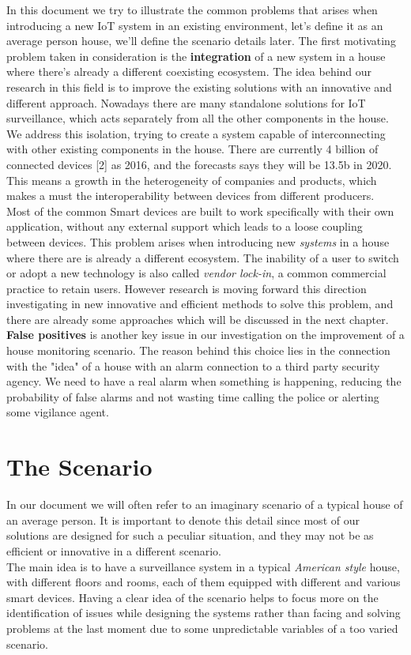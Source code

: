 In this document we try to illustrate the common problems that arises
when introducing a new IoT system in an existing environment, let's define it as
an average person house, we'll define the scenario details later.
The first motivating problem taken in consideration is the \textbf{integration} of a new
system in a house where there's already a different coexisting ecosystem.
The idea behind our research in this field is to improve the existing solutions
with an innovative and different approach. Nowadays there are many standalone
solutions for IoT surveillance, which acts separately from all the other
components in the house. We address this isolation, trying to create
a system capable of interconnecting with other existing components in the house.
There are currently 4 billion of connected devices [2] as 2016, and the forecasts
says they will be 13.5b in 2020. This means a growth in the heterogeneity of companies
and products, which makes a must the interoperability between devices from different
producers.\\
Most of the common Smart devices are built to work specifically with their own application,
without any external support which leads to a loose coupling between devices. This problem
arises when introducing new \textit{systems} in a house where there are is already a different
ecosystem. The inability of a user to switch or adopt a new technology is also called \textit{vendor lock-in},
a common commercial practice to retain users. However research is moving forward
this direction investigating in new innovative and efficient methods to solve this
problem, and there are already some approaches which will be discussed in the next chapter.
\textbf{False positives} is another key issue in our investigation on the improvement of a
house monitoring scenario. The reason behind this choice lies in the connection with the "idea"
of a house with an alarm connection to a third party security agency. We need to have a real
alarm when something is happening, reducing the probability of false alarms and not wasting time
calling the police or alerting some vigilance agent.


\section{The Scenario}

In our document we will often refer to an imaginary scenario of a typical house
of an average person. It is important to denote this detail since most of our
solutions are designed for such a peculiar situation, and they may not be as
efficient or innovative in a different scenario.\\
The main idea is to have a surveillance system in a typical \textit{American style}
house, with different floors and rooms, each of them equipped with different
and various smart devices. Having a clear idea of the scenario helps to focus more
on the identification of issues while designing the systems rather than facing
and solving problems at the last moment due to some unpredictable variables of a
too varied scenario.


